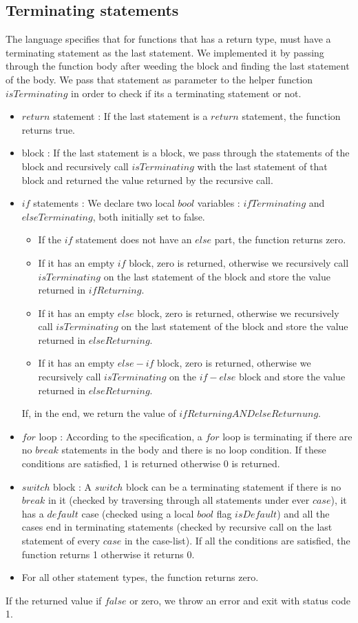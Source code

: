 \documentclass[preprint,12pt]{elsarticle}
\begin{document}
\subsection{Terminating statements}
The language specifies that for functions that has a return type, must have a terminating statement as the last statement. We implemented it by passing through the function body after weeding the block and finding the last statement of the body. We pass that statement as parameter to the helper function $isTerminating$ in order to check if its a terminating statement or not.
\begin{itemize}
\item $return$ statement : If the last statement is a $return$ statement, the function returns true. 
\item block : If the last statement is a block, we pass through the statements of the block and recursively call $isTerminating$ with the last statement of that block and returned the value returned by the recursive call.
\item $if$ statements : We declare two local $bool$ variables : $ifTerminating$ and $elseTerminating$, both initially set to false. 
\begin{itemize}
\item If the $if$ statement does not have an $else$ part, the function returns zero. 
\item If it has an empty $if$ block, zero is returned, otherwise we recursively call $isTerminating$ on the last statement of the block and store the value returned in $ifReturning$.
\item If it has an empty $else$ block, zero is returned, otherwise we recursively call $isTerminating$ on the last statement of the block and store the value returned in $elseReturning$.
\item If it has an empty $else-if$ block, zero is returned, otherwise we recursively call $isTerminating$ on the $if-else$ block and store the value returned in $elseReturning$.
\end{itemize} 
If, in the end, we return the value of $ifReturning AND elseReturnung$.
\item $for$ loop : According to the specification, a $for$ loop is terminating if there are no $break$ statements in the body and there is no loop condition. If these conditions are satisfied, 1 is returned otherwise 0 is returned.
\item $switch$ block : A $switch$ block can be a terminating statement if there is no $break$ in it (checked by traversing through all statements under ever $case$), it has a $default$ case (checked using a local $bool$ flag $isDefault$) and all the cases end in terminating statements (checked by recursive call on the last statement of every $case$ in the case-list). If all the conditions are satisfied, the function returns 1 otherwise it returns 0. 
\item For all other statement types, the function returns zero.
\end{itemize}
If the returned value if $false$ or zero, we throw an error and exit with status code 1.
\end{document}
